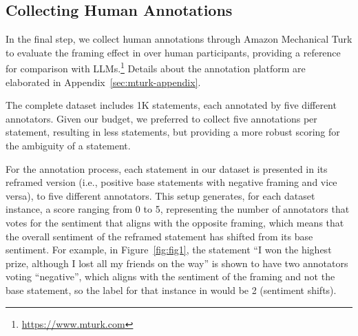 

\subsection{Collecting Human Annotations}\label{sec:human-annotations}

In the final step, we collect human annotations through Amazon Mechanical Turk to evaluate the framing effect in \name{} over human participants, providing a reference for comparison with LLMs.\footnote{\url{https://www.mturk.com}} 
Details about the annotation platform are elaborated in Appendix~\ref{sec:mturk-appendix}.

The complete dataset includes 1K statements, each annotated by five different annotators. Given our budget, we preferred to collect five annotations per statement, resulting in less statements, but providing a more robust scoring for the ambiguity of a statement.


For the annotation process, each statement in our dataset is presented in its reframed version (i.e., positive base statements with negative framing and vice versa), to five different annotators. This setup generates, for each dataset instance, a score ranging from 0 to 5, representing the number of annotators that votes for the sentiment that aligns with the opposite framing, which means that the overall sentiment of the reframed statement has shifted from its base sentiment. For example, in Figure~\ref{fig:fig1}, the statement ``I won the highest prize, although I lost all my friends on the way'' is shown to have two annotators voting ``negative'', which aligns with the sentiment of the framing and not the base statement, so the label for that instance in \name{} would be 2 (sentiment shifts).

